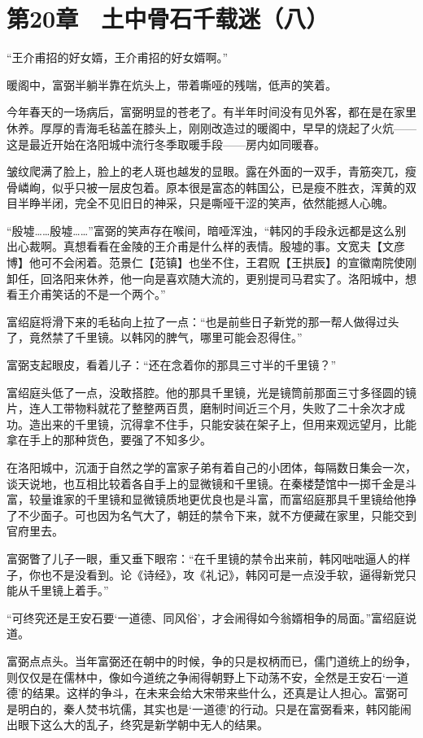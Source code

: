 \section{第20章　土中骨石千载迷（八）}

“王介甫招的好女婿，王介甫招的好女婿啊。”

暖阁中，富弼半躺半靠在炕头上，带着嘶哑的残喘，低声的笑着。

今年春天的一场病后，富弼明显的苍老了。有半年时间没有见外客，都在是在家里休养。厚厚的青海毛毡盖在膝头上，刚刚改造过的暖阁中，早早的烧起了火炕——这是最近开始在洛阳城中流行冬季取暖手段——房内如同暖春。

皱纹爬满了脸上，脸上的老人斑也越发的显眼。露在外面的一双手，青筋突兀，瘦骨嶙峋，似乎只被一层皮包着。原本很是富态的韩国公，已是瘦不胜衣，浑黄的双目半睁半闭，完全不见旧日的神采，只是嘶哑干涩的笑声，依然能撼人心魄。

“殷墟……殷墟……”富弼的笑声存在喉间，暗哑浑浊，“韩冈的手段永远都是这么别出心裁啊。真想看看在金陵的王介甫是什么样的表情。殷墟的事。文宽夫【文彦博】他可不会闲着。范景仁【范镇】也坐不住，王君贶【王拱辰】的宣徽南院使刚卸任，回洛阳来休养，他一向是喜欢随大流的，更别提司马君实了。洛阳城中，想看王介甫笑话的不是一个两个。”

富绍庭将滑下来的毛毡向上拉了一点：“也是前些日子新党的那一帮人做得过头了，竟然禁了千里镜。以韩冈的脾气，哪里可能会忍得住。”

富弼支起眼皮，看着儿子：“还在念着你的那具三寸半的千里镜？”

富绍庭头低了一点，没敢搭腔。他的那具千里镜，光是镜筒前那面三寸多径圆的镜片，连人工带物料就花了整整两百贯，磨制时间近三个月，失败了二十余次才成功。造出来的千里镜，沉得拿不住手，只能安装在架子上，但用来观远望月，比能拿在手上的那种货色，要强了不知多少。

在洛阳城中，沉湎于自然之学的富家子弟有着自己的小团体，每隔数日集会一次，谈天说地，也互相比较着各自手上的显微镜和千里镜。在秦楼楚馆中一掷千金是斗富，较量谁家的千里镜和显微镜质地更优良也是斗富，而富绍庭那具千里镜给他挣了不少面子。可也因为名气大了，朝廷的禁令下来，就不方便藏在家里，只能交到官府里去。

富弼瞥了儿子一眼，重又垂下眼帘：“在千里镜的禁令出来前，韩冈咄咄逼人的样子，你也不是没看到。论《诗经》，攻《礼记》，韩冈可是一点没手软，逼得新党只能从千里镜上着手。”

“可终究还是王安石要‘一道德、同风俗’，才会闹得如今翁婿相争的局面。”富绍庭说道。

富弼点点头。当年富弼还在朝中的时候，争的只是权柄而已，儒门道统上的纷争，则仅仅是在儒林中，像如今道统之争闹得朝野上下动荡不安，全然是王安石‘一道德’的结果。这样的争斗，在未来会给大宋带来些什么，还真是让人担心。富弼可是明白的，秦人焚书坑儒，其实也是‘一道德’的行动。只是在富弼看来，韩冈能闹出眼下这么大的乱子，终究是新学朝中无人的结果。

